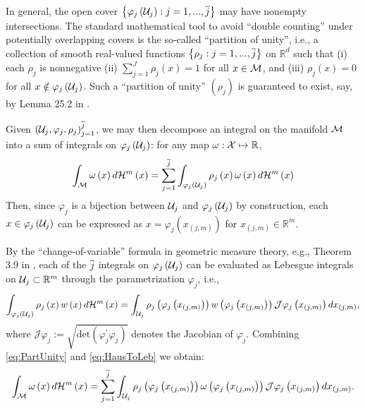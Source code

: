 \documentclass[12pt,american]{article}
\theoremstyle{definition}
\theoremstyle{plain}
\theoremstyle{definition}
\theoremstyle{plain}
\theoremstyle{plain}
\theoremstyle{plain}
\theoremstyle{plain}
\theoremstyle{plain}
\newcommand{\R}{\mathbb{R}}
\begin{document}
In general, the open cover $\left\{ \varphi_{j}\left({\cal U}_{j}\right):j=1,...,\overline{j}\right\} $
may have nonempty intersections. The standard mathematical tool to
avoid ``double counting'' under potentially overlapping covers is
the so-called ``partition of unity'', i.e., a collection of smooth
real-valued functions $\left\{ \rho_{j}:j=1,...,\overline{j}\right\} $ on
$\R^{d}$ such that (i) each $\rho_{j}$ is nonnegative (ii) $\sum_{j=1}^{J}\rho_{j}\left(x\right)=1$
for all $x\in{\cal M}$, and (iii) $\rho_{j}\left(x\right)=0$ for
all $x\notin\varphi_{j}\left({\cal U}_{j}\right)$. Such a ``partition
of unity'' $\left(\rho_{j}\right)$ is guaranteed to exist, say,
by Lemma 25.2 in \citet*{munkres1991analysis}.

Given $\left({\cal U}_{j},\varphi_{j},\rho_{j}\right)_{j=1}^{\overline{j}}$,
we may then decompose an integral on the manifold ${\cal M}$ into
a sum of integrals on $\varphi_{j}\left({\cal U}_{j}\right)$: for any map $\omega:{\cal X}\mapsto \R$,
\begin{equation}
\int_{{\cal M}}\omega\left(x\right)d{\cal H}^{m}\left(x\right)=\sum_{j=1}^{\overline{j}}\int_{\varphi_{j}\left({\cal U}_{j}\right)}\rho_{j}\left(x\right)\omega \left(x\right)d{\cal H}^{m}\left(x\right)\label{eq:PartUnity}
\end{equation}
Then, since $\varphi_{j}$ is a bijection between ${\cal U}_{j}$
and $\varphi_{j}\left({\cal U}_{j}\right)$ by construction, each
$x\in\varphi_{j}\left({\cal U}_{j}\right)$ can be expressed as $x=\varphi_{j}\left(x_{\left(j,m\right)}\right)$ for $x_{\left(j,m\right)} \in \R^m$.

By the ``change-of-variable'' formula in geometric measure theory,
e.g., Theorem 3.9 in \citet*{evans2015measure}, each of the $\overline{j}$
integrals on $\varphi_{j}\left({\cal U}_{j}\right)$ can be evaluated
as Lebesgue integrals on ${\cal U}_{j}\subset \R^m$ through the parametrization
$\varphi_{j}$, i.e.,
\begin{equation}
\int_{\varphi_{j}\left({\cal U}_{j}\right)}\rho_{j}\left(x\right)w\left(x\right)d{\cal H}^{m}\left(x\right)=\int_{{\cal U}_{j}}\rho_{j}\left(\varphi_{j}\left(x_{\left(j,m\right)}\right)\right)w\left(\varphi_{j}\left(x_{\left(j,m\right)}\right)\right)\mathcal{J}\varphi_{j}\left(x_{\left(j,m\right)}\right)dx_{\left(j,m\right)},\label{eq:HausToLeb}
\end{equation}
where $\mathcal{J}\varphi_{j}:=\sqrt{\text{det}\left(\varphi_{j}^{'}\varphi_{j}\right)}$
denotes the Jacobian of $\varphi_{j}$.
Combining \eqref{eq:PartUnity} and \eqref{eq:HausToLeb}
we obtain:
\begin{equation}
\int_{{\cal M}}\omega\left(x\right)d{\cal H}^{m}\left(x\right)=\sum_{j=1}^{\overline{j}}\int_{{\cal U}_{j}}\rho_{j}\left(\varphi_{j}\left(x_{\left(j,m\right)}\right)\right)
\omega\left(\varphi_{j}\left(x_{\left(j,m\right)}\right)\right)\mathcal{J}\varphi_{j}\left(x_{\left(j,m\right)}\right)dx_{\left(j,m\right)}.\label{eq:PieceLebInt}
\end{equation}
\end{document}
